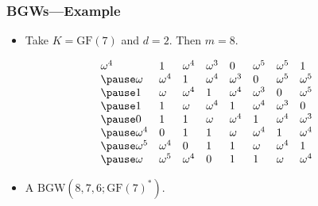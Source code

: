 \documentclass{beamer}
\newcommand{\bgw}{\mathrm{BGW}}
\newcommand{\gf}{\mathrm{GF}}
\begin{document}
 \begin{frame}
  \frametitle{BGWs---Example}
  \begin{itemize}
   \item Take $K = \gf(7)$ and $d=2$. Then $m = 8$.
  \end{itemize}
  \pause
  \[
\begin{array}{llllllll}
\omega^4 & 1 & \omega^4 & \omega^3 & 0 & \omega^5 & \omega^5 & 1 \\ \pause
\omega & \omega^4 & 1 & \omega^4 & \omega^3 & 0 & \omega^5 & \omega^5 \\ \pause
1 & \omega & \omega^4 & 1 & \omega^4 & \omega^3 & 0 & \omega^5 \\ \pause
1 & 1 & \omega & \omega^4 & 1 & \omega^4 & \omega^3 & 0 \\ \pause
0 & 1 & 1 & \omega & \omega^4 & 1 & \omega^4 & \omega^3 \\ \pause
\omega^4 & 0 & 1 & 1 & \omega & \omega^4 & 1 & \omega^4 \\ \pause
\omega^5 & \omega^4 & 0 & 1 & 1 & \omega & \omega^4 & 1 \\ \pause
\omega & \omega^5 & \omega^4 & 0 & 1 & 1 & \omega & \omega^4 
\end{array}
  \]
  \begin{itemize}
   \item A $\bgw(8,7,6; \gf(7)^*)$.
  \end{itemize}
 \end{frame}
\end{document}

